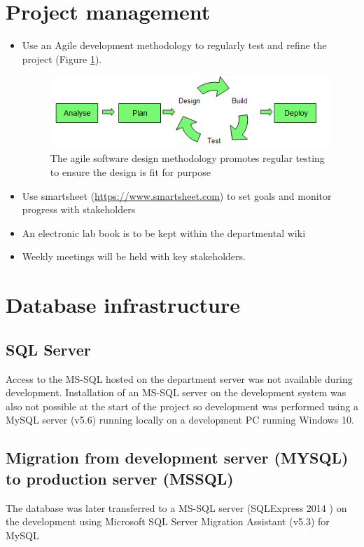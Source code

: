 \section{Project management}
\begin{itemize}
\item Use an Agile development methodology to regularly test and refine the project (Figure \ref{fig:Agile}).
\begin{figure}[h]
\centering
\includegraphics[width=1\linewidth]{./Figures/Agile}
\caption{The agile software design methodology promotes regular testing to ensure the design is fit for purpose}
\label{fig:Agile}
\end{figure}
\item Use smartsheet (\url{https://www.smartsheet.com}) to set goals and monitor progress with stakeholders 
\item An electronic lab book is to be kept within the departmental wiki
\item Weekly meetings will be held with key stakeholders.
\end{itemize}

\section{Database infrastructure}
\subsection{SQL Server}
Access to the MS-SQL hosted on the department server was not available during development. Installation of an MS-SQL server on the development system was also not possible at the start of the project so development was performed using a MySQL server (v5.6)\cite{mysql_mysql_????} running locally on a development PC running Windows 10. 

\subsection{Migration from development server (MYSQL) to production server (MSSQL)}
The database was later transferred to a MS-SQL server (SQLExpress 2014 \cite{_sql_????}) on the development using Microsoft SQL Server Migration Assistant (v5.3) for MySQL \cite{_microsoft_????}
